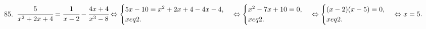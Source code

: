 85. $\cfrac{5}{x^2+2x+4}=\cfrac{1}{x-2}-\cfrac{4x+4}{x^3-8}\Leftrightarrow \begin{cases} 5x-10=x^2+2x+4-4x-4,\\ x
eq2.\end{cases}
\Leftrightarrow \begin{cases} x^2-7x+10=0,\\ x
eq2.\end{cases}\Leftrightarrow \begin{cases} (x-2)(x-5)=0,\\ x
eq2.\end{cases}\Leftrightarrow
x=5.$\\
